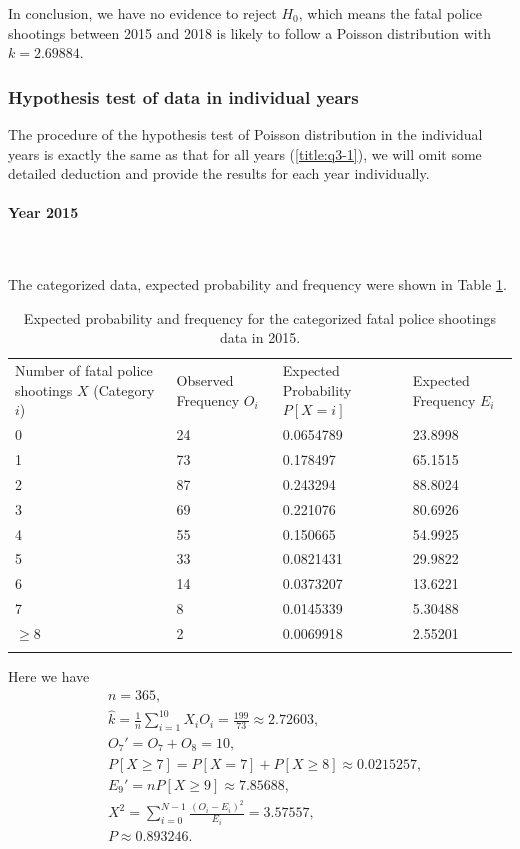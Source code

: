 \documentclass[conf]{new-aiaa}
\begin{document}
In conclusion, we have no evidence to reject $H_0$, which means the fatal police shootings between 2015 and 2018 is likely to follow a Poisson distribution with $k=2.69884.$

\subsubsection{Hypothesis test of data in individual years}

The procedure of the hypothesis test of Poisson distribution in the individual years is exactly the same as that for all years (\ref{title:q3-1}), we will omit some detailed deduction and provide the results for each year individually.

\paragraph{Year 2015}\ 

The categorized data, expected probability and frequency were shown in Table \ref{tab:q3-2015-exp}. \medskip

\begin{table}[!htbp]
\centering
\begin{tabular}{m{3cm}<{\centering}m{3cm}<{\centering}m{3cm}<{\centering}m{3cm}<{\centering}}
\toprule 
\toprule
Number of fatal police shootings $X$ (Category $i$)
 & Observed Frequency $O_i$ 
& Expected Probability $P[X=i]$ & Expected Frequency $E_i$ \\
\noalign{\smallskip}\hline\noalign{\smallskip}
0  &   24   & 0.0654789  & 23.8998\\
1  &   73   & 0.178497   & 65.1515\\
2  &   87   & 0.243294   & 88.8024\\
3  &   69   & 0.221076   & 80.6926\\
4  &   55   & 0.150665   & 54.9925\\
5  &   33   & 0.0821431  & 29.9822\\
6  &   14   & 0.0373207  & 13.6221\\
7  &   8    & 0.0145339  & 5.30488\\
$\geqslant$8  &   2    & 0.0069918  & 2.55201\\
\bottomrule 
\bottomrule  \smallskip
\end{tabular}
\caption{Expected probability and frequency for the categorized fatal police shootings data in 2015.}
\label{tab:q3-2015-exp}
\end{table}

Here we have
\begin{align*}
&n=365,\\
&\hat{k} = \frac{1}{n}\sum_{i=1}^{10} X_iO_i = \frac{199}{73} \approx 2.72603,\\
&O_7'=O_7+O_8=10,\\
&P[X\geqslant7]=P[X=7]+P[X\geqslant8]\approx 0.0215257,\\
&E_9'=nP[X\geqslant9]\approx7.85688,\\
&X^2=\sum_{i=0}^{N-1}\frac{(O_i-E_i)^2}{E_i}=3.57557,\\
&P\approx0.893246.
\end{align*}
\end{document}
